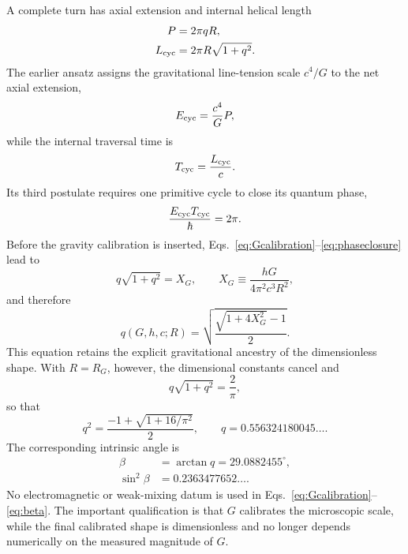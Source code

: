\documentclass[10pt,twocolumn]{article}
\begin{document}
A complete turn has axial extension and internal helical length
\begin{align}
P&=2\pi qR,\\
L_{\rm cyc}&=2\pi R\sqrt{1+q^2}.
\label{eq:cyclelengths}
\end{align}
The earlier ansatz assigns the gravitational line-tension scale $c^4/G$ to the net axial
extension,
\begin{equation}
E_{\rm cyc}=\frac{c^4}{G}P,
\end{equation}
while the internal traversal time is
\begin{equation}
T_{\rm cyc}=\frac{L_{\rm cyc}}{c}.
\end{equation}
Its third postulate requires one primitive cycle to close its quantum phase,
\begin{equation}
\frac{E_{\rm cyc}T_{\rm cyc}}{\hbar}=2\pi.
\label{eq:phaseclosure}
\end{equation}
Before the gravity calibration is inserted, Eqs.~\eqref{eq:Gcalibration}--\eqref{eq:phaseclosure}
lead to
\begin{equation}
q\sqrt{1+q^2}=X_G,
\qquad
X_G\equiv\frac{hG}{4\pi^2c^3R^2},
\label{eq:XG}
\end{equation}
and therefore
\begin{equation}
q(G,h,c;R)=
\sqrt{\frac{\sqrt{1+4X_G^2}-1}{2}}.
\label{eq:qG}
\end{equation}
This equation retains the explicit gravitational ancestry of the dimensionless shape.
With $R=R_G$, however, the dimensional constants cancel and
\begin{equation}
q\sqrt{1+q^2}=\frac{2}{\pi},
\label{eq:qconstraint}
\end{equation}
so that
\begin{equation}
q^2=\frac{-1+\sqrt{1+16/\pi^2}}{2},
\qquad
q=0.556324180045\ldots.
\label{eq:qclosed}
\end{equation}
The corresponding intrinsic angle is
\begin{align}
\beta&=\arctan q=29.0882455^\circ,\\
\sin^2\beta&=0.2363477652\ldots.
\label{eq:beta}
\end{align}
No electromagnetic or weak-mixing datum is used in Eqs.~\eqref{eq:Gcalibration}--\eqref{eq:beta}.
The important qualification is that $G$ calibrates the microscopic scale, while the final
calibrated shape is dimensionless and no longer depends numerically on the measured magnitude of
$G$.
\end{document}
